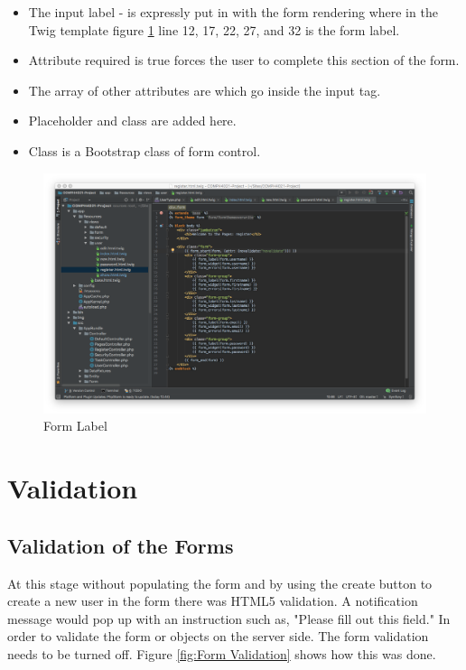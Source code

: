 \begin{itemize}
  \item The input label - is expressly put in with the form rendering where in the Twig template figure \ref{fig:Form Label} line 12, 17, 22, 27, and 32 is the form label.
    \item Attribute required is true forces the user to complete this section of the form.
      \item The array of other attributes are which go inside the input tag.
        \item Placeholder and class are added here.
          \item Class is a Bootstrap class of form control.
\end{itemize}

\begin{figure}[htbp]
   \centering
   \includegraphics[width=400pt]{figures/form_label.png} %
   \caption{Form Label}
   \label{fig:Form Label}
\end{figure}

\section{Validation}

\subsection{Validation of the Forms}

At this stage without populating the form and by using the create button to create a new user in the form there was HTML5 validation. A notification message would pop up with an instruction such as, "Please fill out this field." In order to validate the form or objects on the server side. The form validation needs to be turned off. Figure \ref{fig:Form Validation} shows how this was done.

